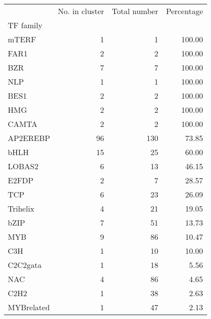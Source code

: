 \begin{tabular}{lrrr}
\toprule
{} &  No. in cluster &  Total number &  Percentage \\
TF family  &                 &               &             \\
\midrule
mTERF      &               1 &             1 &      100.00 \\
FAR1       &               2 &             2 &      100.00 \\
BZR        &               7 &             7 &      100.00 \\
NLP        &               1 &             1 &      100.00 \\
BES1       &               2 &             2 &      100.00 \\
HMG        &               2 &             2 &      100.00 \\
CAMTA      &               2 &             2 &      100.00 \\
AP2EREBP   &              96 &           130 &       73.85 \\
bHLH       &              15 &            25 &       60.00 \\
LOBAS2     &               6 &            13 &       46.15 \\
E2FDP      &               2 &             7 &       28.57 \\
TCP        &               6 &            23 &       26.09 \\
Trihelix   &               4 &            21 &       19.05 \\
bZIP       &               7 &            51 &       13.73 \\
MYB        &               9 &            86 &       10.47 \\
C3H        &               1 &            10 &       10.00 \\
C2C2gata   &               1 &            18 &        5.56 \\
NAC        &               4 &            86 &        4.65 \\
C2H2       &               1 &            38 &        2.63 \\
MYBrelated &               1 &            47 &        2.13 \\
\bottomrule
\end{tabular}
